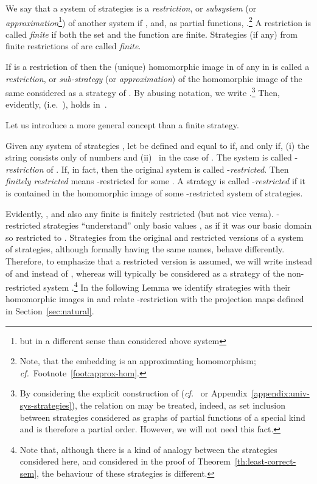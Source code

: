\documentclass[fleqn]{LMCS}
\theoremstyle{plain}\newtheorem{satz}[thm]{Satz}
\theoremstyle{plain}\newtheorem{hyp}[thm]{Hypothesis}
\theoremstyle{plain}\newtheorem{hyps}[thm]{Hypotheses}
\theoremstyle{definition}\newtheorem{note}[thm]{Note}
\def\cf{{\em cf.}}
\newcommand{\?}{\mbox{?}}
\begin{document}
\begin{defi}\label{def:restricted}We say that a system of strategies  
is a \emph{restriction}, or \emph{subsystem } 
(or \emph{approximation}\footnote{but in a different sense than considered above 
system 
})
of
another system  if , 
and, as partial functions, .\footnote{Note, that the embedding  is  
an approximating homomorphism; \cf\ Footnote~\ref{foot:approx-hom}. 
}
A restriction  is called \emph{finite} if both 
the set  and the function  are finite. 
Strategies (if any) from finite restrictions of  are called 
\emph{finite}. 
\end{defi}

\noindent
If  is a restriction of  
then the (unique)
homomorphic image  in  of any  in
 is called a 
\emph{restriction}, or \emph{sub-strategy} (or \emph{approximation}) 
of the homomorphic
image  of the same  considered as a strategy of . 
By abusing notation, we write .\footnote{By considering the explicit construction of  
(\cf\ \cite{Saz76t} or Appendix~\ref{appendix:univ-sys-strategies}), the relation  on  may be treated, indeed, 
as set inclusion between strategies considered as graphs of partial functions 
of a special kind and is therefore 
a partial order. However, we will not need this fact. 
}
Then, evidently,  (i.e.\ ), holds in~.

Let us introduce a more general concept than a finite strategy. 

\begin{defi}\label{def:finitely-restricted}Given any system of strategies , 
let  be defined and equal to  
if, and only if, (i) the string  consists only of numbers  
and (ii)~ in the case of . 
The system  
is called \mbox{-\emph{restriction}} of . 
If, in fact,  then 
the original system is called \mbox{-\emph{restricted}}. 
Then \emph{finitely restricted} means -restricted for some . 
A strategy  is called -\emph{restricted} if it is contained in the homomorphic 
image of some -restricted system of strategies. 
\end{defi}
\noindent
Evidently, , and also 
any finite  is finitely restricted (but not vice versa). 
-restricted strategies ``understand'' only basic values , 
as if it was our basic domain  so restricted to 
. 
Strategies from the original and restricted versions 
of a system of strategies, although formally having the same names, 
behave differently. Therefore, to emphasize that a restricted version 
is assumed, we will write  instead of  and 
 instead of , 
whereas  will typically be considered as a strategy of the 
non-restricted system .\footnote{Note that, although there is a kind of analogy between the strategies  
considered here, and  considered in the proof of 
Theorem~\ref{th:least-correct-sem}, the behaviour of these strategies is different. 
}
In the following Lemma 
we identify strategies with their homomorphic images in  
and relate -restriction with the projection maps  
defined in Section~\ref{sec:natural}. 
\end{document}
